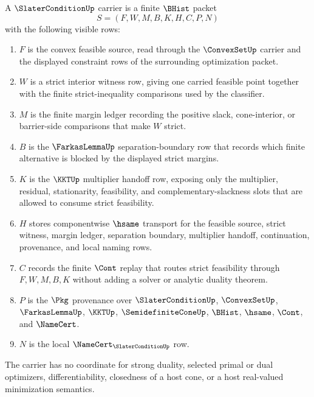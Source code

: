 \begin{definition}
\label{def:slater-condition-carrier}
A $\SlaterConditionUp$ carrier is a finite $\BHist$ packet
$$
S=(F,W,M,B,K,H,C,P,N)
$$
with the following visible rows:
\begin{enumerate}
\item $F$ is the convex feasible source, read through the $\ConvexSetUp$ carrier and the displayed constraint rows of the surrounding optimization packet.
\item $W$ is a strict interior witness row, giving one carried feasible point together with the finite strict-inequality comparisons used by the classifier.
\item $M$ is the finite margin ledger recording the positive slack, cone-interior, or barrier-side comparisons that make $W$ strict.
\item $B$ is the $\FarkasLemmaUp$ separation-boundary row that records which finite alternative is blocked by the displayed strict margins.
\item $K$ is the $\KKTUp$ multiplier handoff row, exposing only the multiplier, residual, stationarity, feasibility, and complementary-slackness slots that are allowed to consume strict feasibility.
\item $H$ stores componentwise $\hsame$ transport for the feasible source, strict witness, margin ledger, separation boundary, multiplier handoff, continuation, provenance, and local naming rows.
\item $C$ records the finite $\Cont$ replay that routes strict feasibility through $F,W,M,B,K$ without adding a solver or analytic duality theorem.
\item $P$ is the $\Pkg$ provenance over $\SlaterConditionUp$, $\ConvexSetUp$, $\FarkasLemmaUp$, $\KKTUp$, $\SemidefiniteConeUp$, $\BHist$, $\hsame$, $\Cont$, and $\NameCert$.
\item $N$ is the local $\NameCert_{\SlaterConditionUp}$ row.
\end{enumerate}
The carrier has no coordinate for strong duality, selected primal or dual optimizers, differentiability, closedness of a host cone, or a host real-valued minimization semantics.
\end{definition}


